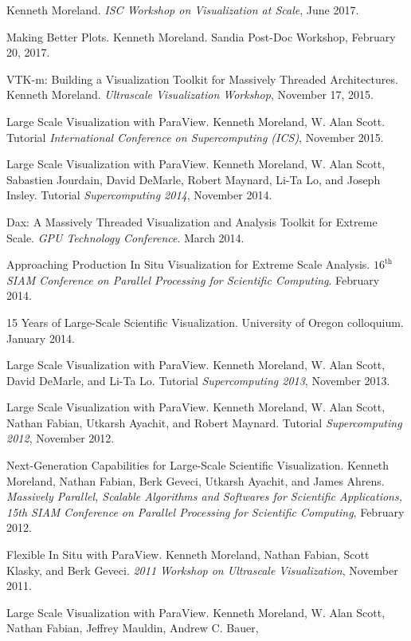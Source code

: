 \documentclass{article}
\begin{document}
\begin{enumerate}[label={[\arabic*]}]
  Kenneth Moreland.
  \emph{ISC Workshop on Visualization at Scale}, June 2017.
\item Making Better Plots.
  Kenneth Moreland.
  Sandia Post-Doc Workshop, February 20, 2017.
\item VTK-m: Building a Visualization Toolkit for Massively Threaded Architectures.
  Kenneth Moreland.
  \emph{Ultrascale Visualization Workshop}, November 17, 2015.
\item Large Scale Visualization with ParaView. Kenneth Moreland, W.
  Alan Scott. Tutorial \emph{International Conference on Supercomputing
    (ICS)}, November 2015.
\item Large Scale Visualization with ParaView. Kenneth Moreland, W.
  Alan Scott, Sabastien Jourdain, David DeMarle, Robert Maynard, Li-Ta
  Lo, and Joseph Insley. Tutorial \emph{Supercomputing 2014}, November
  2014.
\item Dax: A Massively Threaded Visualization and Analysis Toolkit for
  Extreme Scale. \emph{GPU Technology Conference}. March 2014.
\item Approaching Production In Situ Visualization for Extreme Scale
  Analysis. \emph{$16^{\mathrm{th}}$ SIAM Conference on Parallel
  Processing for Scientific Computing}. February 2014.
\item 15 Years of Large-Scale Scientific Visualization. University of
  Oregon colloquium. January 2014.
\item Large Scale Visualization with ParaView. Kenneth Moreland, W.
  Alan Scott, David DeMarle, and Li-Ta Lo. Tutorial
  \emph{Supercomputing 2013}, November 2013.
\item Large Scale Visualization with ParaView. Kenneth Moreland,
  W. Alan Scott, Nathan Fabian, Utkarsh Ayachit, and Robert
  Maynard. Tutorial \emph{Supercomputing 2012}, November 2012.
\item Next-Generation Capabilities for Large-Scale Scientific
  Visualization. Kenneth Moreland, Nathan Fabian, Berk Geveci, Utkarsh
  Ayachit, and James Ahrens. \emph{Massively Parallel, Scalable
    Algorithms and Softwares for Scientific Applications, 15th SIAM
    Conference on Parallel Processing for Scientific Computing},
  February 2012.
\item Flexible In Situ with ParaView. Kenneth Moreland, Nathan Fabian,
  Scott Klasky, and Berk Geveci. \emph{2011 Workshop on Ultrascale
    Visualization}, November 2011.
\item Large Scale Visualization with ParaView. Kenneth Moreland,
  W. Alan Scott, Nathan Fabian, Jeffrey Mauldin, Andrew C. Bauer,

\end{enumerate}
\end{document}
